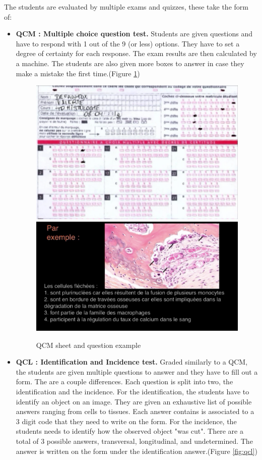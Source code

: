 \documentclass[a4paper,11pt]{report}
\numberwithin{figure}{section} %
\begin{document}
	The students are evaluated by multiple exams and quizzes, these take the form of:
    \begin{itemize}
    \item[\textbullet]  \textbf{QCM : Multiple choice question test.}
    Students are given questions and have to respond with 1 out of the 9 (or less) options.
    They have to set a degree of certainty for each response.
    The exam results are then calculated by a machine.
    The students are also given more boxes to answer in case they make a mistake the first time.(Figure \ref{fig:qcm})
    \begin{figure}[H]
    \centering
     \includegraphics[width=0.4\linewidth]{images/exam_qcm.png}
     \includegraphics[width=0.5\linewidth]{images/exam_qcm2.png}
     \caption{QCM sheet and question example}
     \label{fig:qcm}
    \end{figure}
	\item[\textbullet]  \textbf{QCL : Identification and Incidence test.}
	Graded similarly to a QCM, the students are given multiple questions to answer and they have to fill out a form.
	The are a couple differences.
	Each question is split into two, the identification and the incidence.
	For the identification, the students have to identify an object on an image.
	They are given an exhaustive list of possible answers ranging from cells to tissues.
	Each answer contains is associated to a 3 digit code that they need to write on the form.
	For the incidence, the students needs to identify how the observed object "was cut".
	There are a total of 3 possible answers, transversal, longitudinal, and undetermined.
	The answer is written on the form under the identification answer.(Figure \ref{fig:qcl})
      \begin{figure}[H]
    \centering

\end{figure}
\end{itemize}
\end{document}
